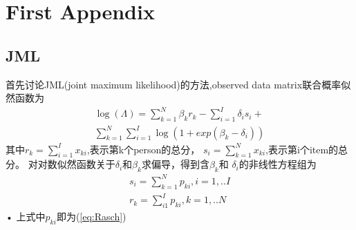 \documentclass[12pt]{article}
\begin{document}
\section{First Appendix}\label{A1}
\subsection{JML}
首先讨论JML(joint maximum likelihood)的方法,observed data matrix联合概率似然函数为
\begin{equation}
\begin{split}
\log(\Lambda)=\sum_{k=1}^N \beta_k r_k -\sum_{i=1}^I \delta_i s_i+ \\
\sum_{k=1}^N \sum_{i=1}^I \log(1+exp(\beta_k-\delta_i))
\end{split}
\end{equation}
其中$r_k=\displaystyle\sum_{i=1}^I x_{ki}$,表示第k个person的总分，
$s_i=\displaystyle\sum_{k=1}^N x_{ki}$,表示第i个item的总分。
对对数似然函数关于$\delta_i$和$\beta_k$求偏导，得到含$\beta_k$和
$\delta_i$的非线性方程组为
\begin{eqnarray}\label{eq:JML}
s_i=\sum_{k=1}^N p_{ki},i=1,..I\\
r_k=\sum_{i1}^I p_{ki},k=1,..N
\end{eqnarray}•
上式中$p_{ki}$即为(\ref{eq:Rasch})
\end{document}
